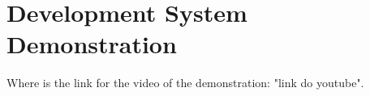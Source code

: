 \newpage

\section{Development System Demonstration}

Where is the link for the video of the demonstration: "link do youtube".